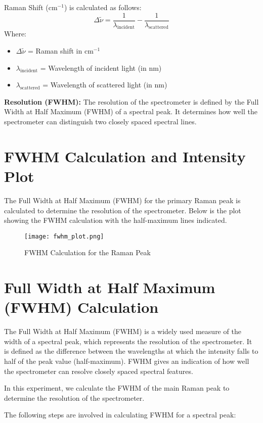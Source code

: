 \documentclass{article}
\begin{document}
Raman Shift (cm$^{-1}$) is calculated as follows:\n\begin{equation*}\Delta \tilde{\nu} = \frac{1}{\lambda_{\text{incident}}} - \frac{1}{\lambda_{\text{scattered}}}\end{equation*} Where: \begin{itemize}\item $\Delta \tilde{\nu}$ = Raman shift in cm$^{-1}$\item $\lambda_{\text{incident}}$ = Wavelength of incident light (in nm)\item $\lambda_{\text{scattered}}$ = Wavelength of scattered light (in nm)\end{itemize}\n\n\textbf{Resolution (FWHM):}
The resolution of the spectrometer is defined by the Full Width at Half Maximum (FWHM) of a spectral peak. It determines how well the spectrometer can distinguish two closely spaced spectral lines.\n\n
\section*{FWHM Calculation and Intensity Plot}
The Full Width at Half Maximum (FWHM) for the primary Raman peak is calculated to determine the resolution of the spectrometer. Below is the plot showing the FWHM calculation with the half-maximum lines indicated.
\begin{figure}[h!]
\centering
\texttt{[image: fwhm\_plot.png]}
\caption{FWHM Calculation for the Raman Peak}
\end{figure}

    \section*{Full Width at Half Maximum (FWHM) Calculation}

    The Full Width at Half Maximum (FWHM) is a widely used measure of the width of a spectral peak, which represents the resolution of the spectrometer. It is defined as the difference between the wavelengths at which the intensity falls to half of the peak value (half-maximum). FWHM gives an indication of how well the spectrometer can resolve closely spaced spectral features. 

    In this experiment, we calculate the FWHM of the main Raman peak to determine the resolution of the spectrometer.

    The following steps are involved in calculating FWHM for a spectral peak:
\end{document}

